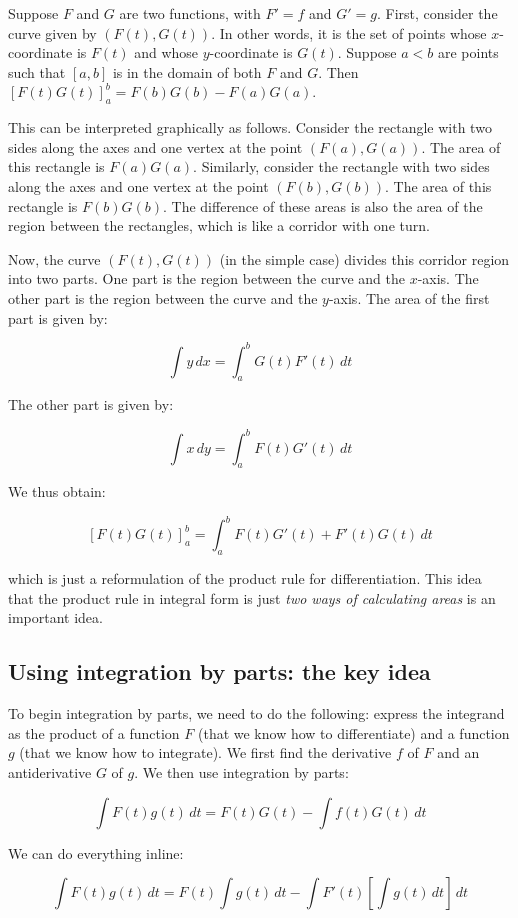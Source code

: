 \documentclass{amsart}
\begin{document}
Suppose $F$ and $G$ are two functions, with $F' = f$ and $G'
=g$. First, consider the curve given by $(F(t),G(t))$. In other words,
it is the set of points whose $x$-coordinate is $F(t)$ and whose
$y$-coordinate is $G(t)$. Suppose $a < b$ are points such that $[a,b]$
is in the domain of both $F$ and $G$. Then $[F(t)G(t)]_a^b = F(b)G(b)
- F(a)G(a)$.

This can be interpreted graphically as follows. Consider the rectangle
with two sides along the axes and one vertex at the point
$(F(a),G(a))$. The area of this rectangle is $F(a)G(a)$. Similarly,
consider the rectangle with two sides along the axes and one vertex at
the point $(F(b),G(b))$. The area of this rectangle is $F(b)G(b)$. The
difference of these areas is also the area of the region between the
rectangles, which is like a corridor with one turn.

Now, the curve $(F(t),G(t))$ (in the simple case) divides this
corridor region into two parts. One part is the region between the
curve and the $x$-axis. The other part is the region between the curve
and the $y$-axis. The area of the first part is given by:

$$\int y \, dx = \int_a^b G(t)F'(t) \, dt$$

The other part is given by:

$$\int x \, dy = \int_a^b F(t)G'(t) \, dt$$

We thus obtain:

$$[F(t)G(t)]_a^b = \int_a^b F(t)G'(t) + F'(t)G(t) \, dt$$

which is just a reformulation of the product rule for
differentiation. This idea that the product rule in integral form is
just {\em two ways of calculating areas} is an important idea.

\subsection{Using integration by parts: the key idea}

To begin integration by parts, we need to do the following: express
the integrand as the product of a function $F$ (that we know how to
differentiate) and a function $g$ (that we know how to integrate). We
first find the derivative $f$ of $F$ and an antiderivative $G$ of
$g$. We then use integration by parts:

$$\int F(t)g(t) \, dt= F(t)G(t) - \int f(t)G(t) \, dt$$

We can do everything inline:

$$\int F(t) g(t) \, dt = F(t)\int g(t) \, dt - \int F'(t) [\int g(t) \, dt] \, dt$$
\end{document}
